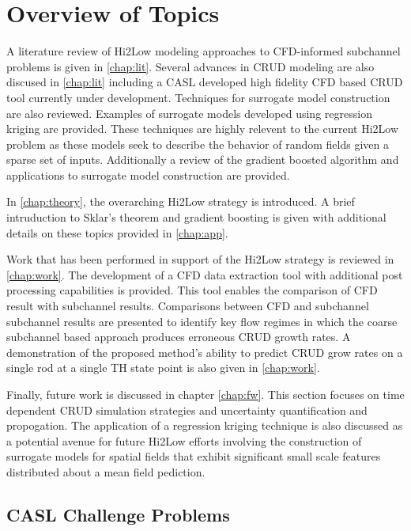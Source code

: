 \section{Overview of Topics}

A literature review of Hi2Low modeling approaches to CFD-informed subchannel
problems is given in \autoref{chap:lit}.  Several advances in CRUD modeling are
also discused in \autoref{chap:lit} including a CASL developed high fidelity
CFD based CRUD tool currently under development.
Techniques for surrogate model construction are also reviewed.  Examples of
surrogate models developed using regression kriging are provided.  These
techniques are highly relevent to the current Hi2Low problem as these models
seek to describe the behavior of random fields given a sparse set of inputs.
Additionally a review
of the gradient boosted algorithm and applications to surrogate model construction
are provided.

In \autoref{chap:theory}, the overarching Hi2Low strategy is introduced.  A brief
intruduction to Sklar's theorem and gradient boosting is given with additional details
on these topics provided in \autoref{chap:app}.

Work that has been performed in support of the Hi2Low strategy is reviewed in
\autoref{chap:work}.  The development of a CFD data extraction tool with
additional post processing capabilities is provided.  This tool enables the
comparison of CFD result with subchannel results.  Comparisons between CFD and subchannel
subchannel results are presented to identify key flow regimes in which the
coarse subchannel based approach produces erroneous CRUD growth rates.
A demonstration of the proposed method's ability to predict CRUD grow rates on a
single rod at a single TH state point is also given in
\autoref{chap:work}.

Finally, future work is discussed in chapter \autoref{chap:fw}.  This section focuses on
time dependent CRUD simulation strategies and uncertainty quantification and propogation.
The application of a regression kriging technique is also discussed as a potential
avenue for future Hi2Low efforts involving the construction of surrogate models for
 spatial fields that exhibit significant small scale features distributed about a mean
 field pediction.

\subsection{CASL Challenge Problems}

